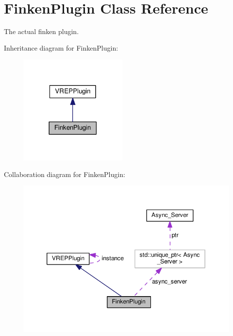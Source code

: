\hypertarget{classFinkenPlugin}{}\section{Finken\+Plugin Class Reference}
\label{classFinkenPlugin}


The actual finken plugin.  




Inheritance diagram for Finken\+Plugin\+:\nopagebreak
\begin{figure}[H]
\begin{center}
\leavevmode
\includegraphics[width=153pt]{classFinkenPlugin__inherit__graph}
\end{center}
\end{figure}


Collaboration diagram for Finken\+Plugin\+:\nopagebreak
\begin{figure}[H]
\begin{center}
\leavevmode
\includegraphics[width=346pt]{classFinkenPlugin__coll__graph}
\end{center}
\end{figure}
